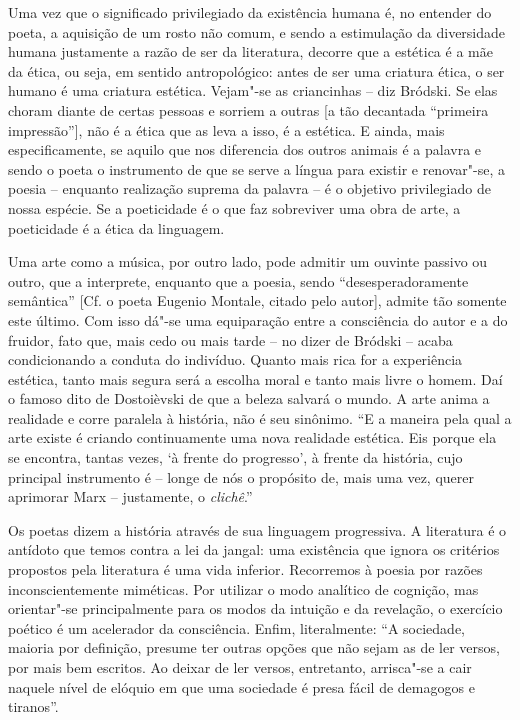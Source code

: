 Uma vez que o significado privilegiado da existência humana é, no
entender do poeta, a aquisição de um rosto não comum, e sendo a
estimulação da diversidade humana justamente a razão de ser da
literatura, decorre que a estética é a mãe da ética, ou seja, em sentido
antropológico: antes de ser uma criatura ética, o ser humano é uma
criatura estética. Vejam"-se as criancinhas -- diz Bródski. Se elas
choram diante de certas pessoas e sorriem a outras {[}a tão decantada
``primeira impressão''{]}, não é a ética que as leva a isso, é a
estética. E ainda, mais especificamente, se aquilo que nos diferencia
dos outros animais é a palavra e sendo o poeta o instrumento de que se
serve a língua para existir e renovar"-se, a poesia -- enquanto
realização suprema da palavra -- é o objetivo privilegiado de nossa
espécie. Se a poeticidade é o que faz sobreviver uma obra de arte, a
poeticidade é a ética da linguagem.

Uma arte como a música, por outro lado, pode admitir um ouvinte passivo
ou outro, que a interprete, enquanto que a poesia, sendo
``desesperadoramente semântica'' {[}Cf. o poeta Eugenio Montale, citado
pelo autor{]}, admite tão somente este último. Com isso dá"-se uma
equiparação entre a consciência do autor e a do fruidor, fato que, mais
cedo ou mais tarde -- no dizer de Bródski -- acaba condicionando a
conduta do indivíduo. Quanto mais rica for a experiência estética, tanto
mais segura será a escolha moral e tanto mais livre o homem. Daí o
famoso dito de Dostoièvski de que a beleza salvará o mundo. A arte anima
a realidade e corre paralela à história, não é seu sinônimo. ``E a
maneira pela qual a arte existe é criando continuamente uma nova
realidade estética. Eis porque ela se encontra, tantas vezes, `à frente
do progresso', à frente da história, cujo principal instrumento é --
longe de nós o propósito de, mais uma vez, querer aprimorar Marx --
justamente, o \emph{clichê}.''

Os poetas dizem a história através de sua linguagem progressiva. A
literatura é o antídoto que temos contra a lei da jangal: uma existência
que ignora os critérios propostos pela literatura é uma vida inferior.
Recorremos à poesia por razões inconscientemente miméticas. Por utilizar
o modo analítico de cognição, mas orientar"-se principalmente para os
modos da intuição e da revelação, o exercício poético é um acelerador da
consciência. Enfim, literalmente: ``A sociedade, maioria por definição,
presume ter outras opções que não sejam as de ler versos, por mais bem
escritos. Ao deixar de ler versos, entretanto, arrisca"-se a cair naquele
nível de elóquio em que uma sociedade é presa fácil de demagogos e
tiranos''.

